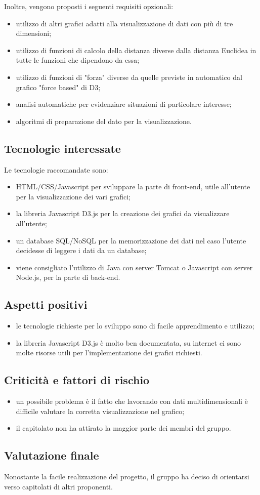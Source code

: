 Inoltre, vengono proposti i seguenti requisiti opzionali:
\begin{itemize}
\item utilizzo di altri grafici adatti alla visualizzazione di dati con più di tre dimensioni;
\item utilizzo di funzioni di calcolo della distanza diverse dalla distanza Euclidea in tutte le funzioni che dipendono da essa;
\item utilizzo di funzioni di "forza" diverse da quelle previste in automatico dal grafico "force based" di D3;
\item analisi automatiche per evidenziare situazioni di particolare interesse;
\item algoritmi di preparazione del dato per la visualizzazione.
\end{itemize}

\subsection{Tecnologie interessate}
Le tecnologie raccomandate sono:
\begin{itemize}
\item HTML/CSS/Javascript per sviluppare la parte di front-end, utile all'utente per la visualizzazione dei vari grafici;
\item la libreria Javascript D3.js per la creazione dei grafici da visualizzare all'utente;
\item un database SQL/NoSQL per la memorizzazione dei dati nel caso l'utente decidesse di leggere i dati da un database;
\item viene consigliato l’utilizzo di Java con server Tomcat o Javascript con server Node.js, per la parte di back-end.
\end{itemize}

\subsection{Aspetti positivi}
\begin{itemize}
\item le tecnologie richieste per lo sviluppo sono di facile apprendimento e utilizzo;
\item la libreria Javascript D3.js è molto ben documentata, su internet ci sono molte risorse utili per l'implementazione dei grafici richiesti.
\end{itemize}

\subsection{Criticità e fattori di rischio}
\begin{itemize}
\item un possibile problema è il fatto che lavorando con dati multidimensionali è difficile valutare la corretta visualizzazione nel grafico;
\item il capitolato non ha attirato la maggior parte dei membri del gruppo.
\end{itemize}

\subsection{Valutazione finale}
Nonostante la facile realizzazione del progetto, il gruppo ha deciso di orientarsi verso capitolati di altri proponenti.